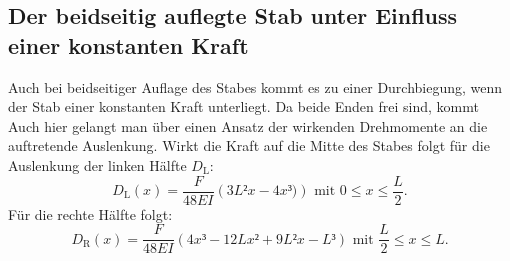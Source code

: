 \subsection{Der beidseitig auflegte Stab unter Einfluss einer konstanten Kraft}
Auch bei beidseitiger Auflage des Stabes kommt es zu einer Durchbiegung, wenn
 der Stab einer konstanten Kraft unterliegt. Da beide Enden frei sind, kommt
 Auch hier gelangt man über einen Ansatz der wirkenden Drehmomente an die
  auftretende Auslenkung. Wirkt die Kraft auf die Mitte des Stabes folgt für die
   Auslenkung der linken Hälfte $D_\text{L}$:
  \begin{equation}
    D_\text{L}(x) = \frac{F}{48 EI}\left(3L²x-4x³)\right) \text{ mit } 0 \leq x \leq \frac{L}{2}\text{.}
  \end{equation}
Für die rechte Hälfte folgt:
\begin{equation}
  D_\text{R}(x) = \frac{F}{48EI}\left(4x³ -12Lx² +9L²x-L³\right) \text{ mit } \frac{L}{2} \leq x \leq L\text{.}
\end{equation}
